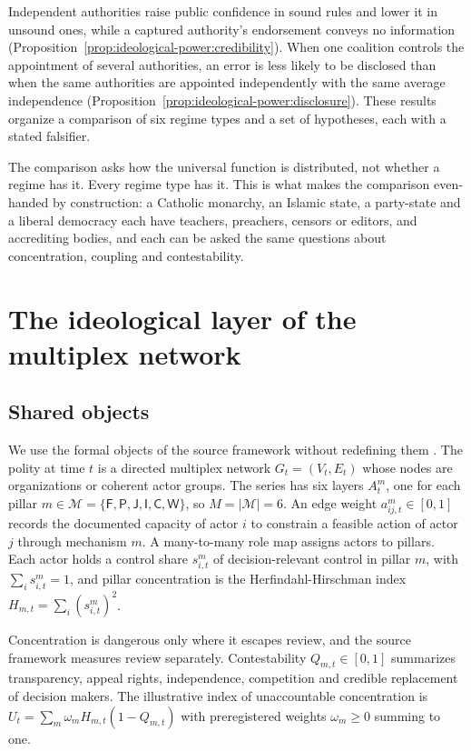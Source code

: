 \documentclass[11pt,letterpaper]{article}
\theoremstyle{definition}
\theoremstyle{remark}
\newcommand{\pF}{\mathsf{F}}
\newcommand{\pP}{\mathsf{P}}
\newcommand{\pJ}{\mathsf{J}}
\newcommand{\pI}{\mathsf{I}}
\newcommand{\pC}{\mathsf{C}}
\newcommand{\pW}{\mathsf{W}}
\newcommand{\Pil}{\mathcal{M}}
\begin{document}
Independent authorities raise public confidence in sound rules and lower it in unsound ones, while a captured authority's endorsement conveys no information (Proposition~\ref{prop:ideological-power:credibility}). When one coalition controls the appointment of several authorities, an error is less likely to be disclosed than when the same authorities are appointed independently with the same average independence (Proposition~\ref{prop:ideological-power:disclosure}). These results organize a comparison of six regime types and a set of hypotheses, each with a stated falsifier.

The comparison asks how the universal function is distributed, not whether a regime has it. Every regime type has it. This is what makes the comparison even-handed by construction: a Catholic monarchy, an Islamic state, a party-state and a liberal democracy each have teachers, preachers, censors or editors, and accrediting bodies, and each can be asked the same questions about concentration, coupling and contestability.

\section{The ideological layer of the multiplex network}
\label{sec:layer}

\subsection{Shared objects}

We use the formal objects of the source framework without redefining them \citep{largo2026hbs}. The polity at time $t$ is a directed multiplex network $G_t=(V_t,E_t)$ whose nodes are organizations or coherent actor groups. The series has six layers $A^m_t$, one for each pillar $m\in\Pil=\{\pF,\pP,\pJ,\pI,\pC,\pW\}$, so $M=|\Pil|=6$. An edge weight $a^m_{ij,t}\in[0,1]$ records the documented capacity of actor $i$ to constrain a feasible action of actor $j$ through mechanism $m$. A many-to-many role map assigns actors to pillars. Each actor holds a control share $s^m_{i,t}$ of decision-relevant control in pillar $m$, with $\sum_i s^m_{i,t}=1$, and pillar concentration is the Herfindahl-Hirschman index $H_{m,t}=\sum_i (s^m_{i,t})^2$.

Concentration is dangerous only where it escapes review, and the source framework measures review separately. Contestability $Q_{m,t}\in[0,1]$ summarizes transparency, appeal rights, independence, competition and credible replacement of decision makers. The illustrative index of unaccountable concentration is $U_t=\sum_m \omega_m H_{m,t}(1-Q_{m,t})$ with preregistered weights $\omega_m\geq 0$ summing to one.
\end{document}
